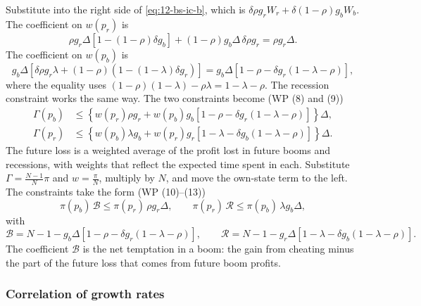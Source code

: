 Substitute into the right side of \eqref{eq:12-bs-ic-b}, which is $\delta\rho g_r W_r + \delta(1-\rho)g_b W_b$. The coefficient on
$w(p_r)$ is
\begin{equation*}
\rho g_r\Delta\left[1 - (1-\rho)\delta g_b\right] + (1-\rho)g_b\Delta\,\delta\rho g_r = \rho g_r \Delta .
\end{equation*}
The coefficient on $w(p_b)$ is
\begin{equation*}
g_b\Delta\left[\delta\rho g_r\lambda + (1-\rho)\left(1 - (1-\lambda)\delta g_r\right)\right]
= g_b\Delta\left[1 - \rho - \delta g_r(1 - \lambda - \rho)\right],
\end{equation*}
where the equality uses $(1-\rho)(1-\lambda) - \rho\lambda = 1 - \lambda - \rho$. The recession constraint works the same way. The
two constraints become (WP (8) and (9))
\begin{align}
\Gamma(p_b) &\le \left\{w(p_r)\rho g_r + w(p_b)g_b\left[1 - \rho - \delta g_r(1 - \lambda - \rho)\right]\right\}\Delta, \label{eq:12-bs-8}\\
\Gamma(p_r) &\le \left\{w(p_b)\lambda g_b + w(p_r)g_r\left[1 - \lambda - \delta g_b(1 - \lambda - \rho)\right]\right\}\Delta. \label{eq:12-bs-9}
\end{align}
The future loss is a weighted average of the profit lost in future booms and recessions, with weights that reflect
the expected time spent in each. Substitute $\Gamma = \frac{N-1}{N}\pi$ and $w = \frac{\pi}{N}$, multiply by $N$, and move the own-state
term to the left. The constraints take the form (WP (10)--(13))
\begin{equation}\label{eq:12-bs-10-11}
\pi(p_b)\,\mathcal{B} \le \pi(p_r)\,\rho g_r\Delta, \qquad \pi(p_r)\,\mathcal{R} \le \pi(p_b)\,\lambda g_b\Delta,
\end{equation}
with
\begin{equation}\label{eq:12-bs-B-R}
\mathcal{B} = N - 1 - g_b\Delta\left[1 - \rho - \delta g_r(1 - \lambda - \rho)\right], \qquad
\mathcal{R} = N - 1 - g_r\Delta\left[1 - \lambda - \delta g_b(1 - \lambda - \rho)\right].
\end{equation}
The coefficient $\mathcal B$ is the net temptation in a boom: the gain from cheating minus the part of the future loss
that comes from future boom profits.

\subsubsection{Correlation of growth rates}

